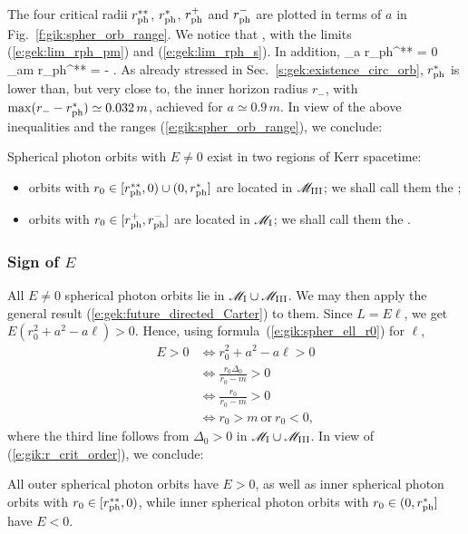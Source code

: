 The four critical radii $r_{\rm ph}^{**}$, $r_{\rm ph}^*$, $r_{\rm ph}^+$ and $r_{\rm ph}^-$
are plotted in terms of $a$ in Fig.~\ref{f:gik:spher_orb_range}. We notice that
\be \label{e:gik:r_crit_order}
  ,
\ee
with the limits (\ref{e:gek:lim_rph_pm}) and (\ref{e:gek:lim_rph_s}). In addition,
\be
    \lim_{a} r_{\rm ph}^{**} = 0 \qand
    \lim_{a\to m} r_{\rm ph}^{**} = -  .
\ee
As already stressed in Sec.~\ref{s:gek:existence_circ_orb}, $r_{\rm ph}^*$ is lower than, but very close to,
the inner horizon radius $r_{-}$, with  $\max (r_- - r_{\rm ph}^*) \simeq 0.032 \, m$,
achieved for $a\simeq 0.9 \, m$.
In view of the above inequalities and the ranges (\ref{e:gik:spher_orb_range}), we conclude:
\begin{prop}
Spherical photon orbits with $E\neq 0$ exist in two regions of Kerr spacetime:
\begin{itemize}
\item orbits with $r_0\in [r_{\rm ph}^{**}, 0) \cup (0, r_{\rm ph}^*]$ are located in $\mathscr{M}_{\rm III}$;
we shall call them the ;
\item orbits with $r_0 \in [r_{\rm ph}^+, r_{\rm ph}^-]$ are located in $\mathscr{M}_{\rm I}$;
we shall call them the .
\end{itemize}
\end{prop}

\subsubsection{Sign of $E$}

All $E\neq 0$ spherical photon orbits lie in $\mathscr{M}_{\rm I}\cup\mathscr{M}_{\rm III}$. We may then apply
the general result (\ref{e:gek:future_directed_Carter}) to them. Since $L = E \ell$, we get
$E (r_0^2 + a^2 - a \ell) > 0$.
Hence, using formula~(\ref{e:gik:spher_ell_r0}) for $\ell$,
\begin{align}
E > 0 & \iff r_0^2 + a^2 - a \ell > 0 \nonumber \\
      & \iff \frac{r_0 \Delta_0}{r_0 - m} > 0 \nonumber \\
      & \iff \frac{r_0}{r_0 - m} > 0  \nonumber \\
      & \iff r_0 > m \ \mbox{or}\ r_0 < 0 , \nonumber
\end{align}
where the third line follows from $\Delta_0 > 0$ in $\mathscr{M}_{\rm I}\cup\mathscr{M}_{\rm III}$.
In view of (\ref{e:gik:r_crit_order}), we conclude:
\begin{prop}
\label{p:gik:sign_E_ph_orbit}
All outer spherical photon orbits have $E>0$, as well as inner spherical photon
orbits with $r_0\in[r_{\rm ph}^{**}, 0)$, %
while inner spherical photon orbits with $r_0\in(0, r_{\rm ph}^*]$
have $E<0$.
\end{prop}

